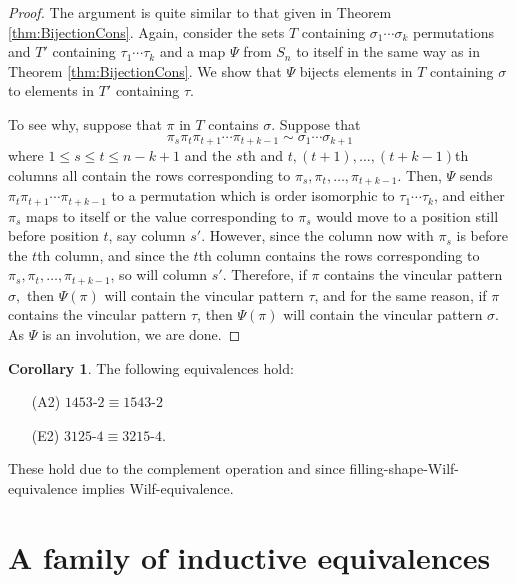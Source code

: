 \documentclass[11pt]{amsart}
\theoremstyle{definition}
\newtheorem{corollary}[theorem]{Corollary}
\begin{document}
\begin{proof}
    The argument is quite similar to that given in Theorem \ref{thm:BijectionCons}.  Again, consider the sets $T$ containing $\sigma_1\cdots\sigma_k$ permutations and $T'$ containing $\tau_1\cdots\tau_k$ and a map $\Psi$ from $S_n$ to itself in the same way as in Theorem \ref{thm:BijectionCons}.  We show that $\Psi$ bijects elements in $T$ containing $\sigma$ to elements in $T'$ containing $\tau.$
    
	To see why, suppose that $\pi$ in $T$ contains $\sigma$.  Suppose that 
	\[ \pi_s \pi_t\pi_{t+1}\cdots\pi_{t+k-1} \sim \sigma_1\cdots\sigma_{k+1} \]
	where $1 \le s \le t \le n-k+1$ and the $s$th and $t, (t+1), \ldots, (t+k-1)$th columns all contain the rows corresponding to $\pi_s, \pi_t, \ldots, \pi_{t+k-1}$.  Then, $\Psi$ sends $\pi_t\pi_{t+1}\cdots\pi_{t+k-1}$ to a permutation which is order isomorphic to $\tau_1\cdots\tau_k$, and either $\pi_s$  maps to itself or the value corresponding to $\pi_s$ would move to a position still before position $t$, say column $s'$.  However, since the column now with $\pi_s$ is before the $t$th column, and since the $t$th column contains the rows corresponding to $\pi_s, \pi_t, \ldots, \pi_{t+k-1}$, so will column $s'$.  Therefore, if $\pi$ contains the vincular pattern $\sigma,$ then $\Psi(\pi)$ will contain the vincular pattern $\tau$, and for the same reason, if $\pi$ contains the vincular pattern $\tau$, then $\Psi(\pi)$ will contain the vincular pattern $\sigma$.  As $\Psi$ is an involution, we are done.
\end{proof}

\begin{corollary} \label{cor:Bijective5quasi}
    The following equivalences hold:
	\begin{enumerate}
		\item[(A2)] $1453{\text{-}}2 \equiv 1543{\text{-}}2$
		\item[(E2)] $3125{\text{-}}4 \equiv 3215{\text{-}}4$.
	\end{enumerate}
\end{corollary}

These hold due to the complement operation and since filling-shape-Wilf-equivalence implies Wilf-equivalence.

\section{A family of inductive equivalences}
\label{sec:sandcastle}
\end{document}
